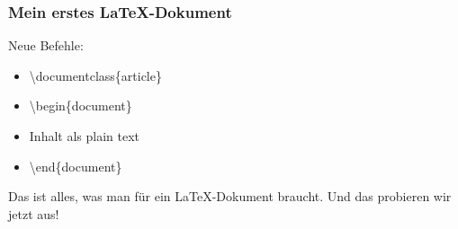\begin{frame}
\frametitle{Mein erstes \LaTeX-Dokument}
\begin{block}{Neue Befehle:}
\begin{itemize}
\item \begin{ttfamily}\color{nounibaredII}\textbackslash documentclass\color{nounibagreenI}\color{black}\{article\}\end{ttfamily}
\item \begin{ttfamily}\color{unibablueI}\textbackslash begin\color{black}\{document\}\end{ttfamily}
\item \begin{ttfamily} Inhalt als plain text \end{ttfamily}
\item \begin{ttfamily}\color{unibablueI}\textbackslash end\color{black}\{document\}\end{ttfamily}
\end{itemize}
\end{block}
Das ist alles, was man für ein \LaTeX-Dokument braucht. Und das probieren wir jetzt aus!

\end{frame}
